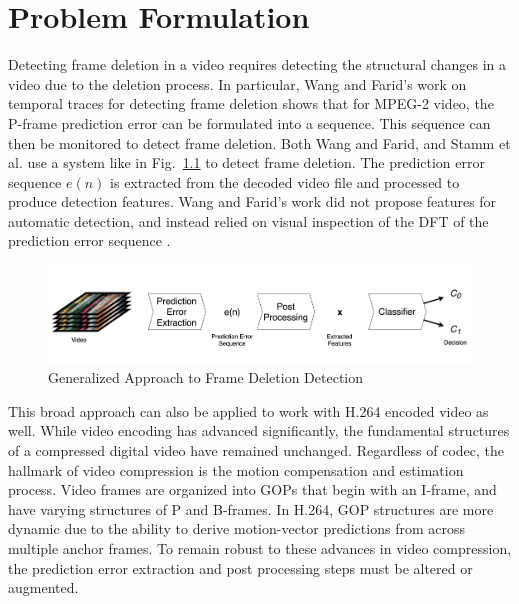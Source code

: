 \chapter{Problem Formulation}

Detecting frame deletion in a video requires detecting the structural changes in a video due to the deletion process. In particular, Wang and Farid's work on temporal traces for detecting frame deletion shows that for MPEG-2 video, the P-frame prediction error can be formulated into a sequence. This sequence can then be monitored to detect frame deletion. Both Wang and Farid, and Stamm et al. use a system like in Fig.~\ref{System} to detect frame deletion. The prediction error sequence $e(n)$ is extracted from the decoded video file and processed to produce detection features. Wang and Farid's work did not propose features for automatic detection, and instead relied on visual inspection of the DFT of the prediction error sequence \cite{wang} \cite{stamm}.

\begin{figure}[htbp]
\centerline{\includegraphics[width=0.9\linewidth]{ProblemFormulation/frame_deletion_detection_system.png}}
\caption{Generalized Approach to Frame Deletion Detection}
\label{System}
\end{figure}

This broad approach can also be applied to work with H.264 encoded video as well. While video encoding has advanced significantly, the fundamental structures of a compressed digital video have remained unchanged. Regardless of codec, the hallmark of video compression is the motion compensation and estimation process. Video frames are organized into GOPs that begin with an I-frame, and have varying structures of P and B-frames. In H.264, GOP structures are more dynamic due to the ability to derive motion-vector predictions from across multiple anchor frames. To remain robust to these advances in video compression, the prediction error extraction and post processing steps must be altered or augmented.

